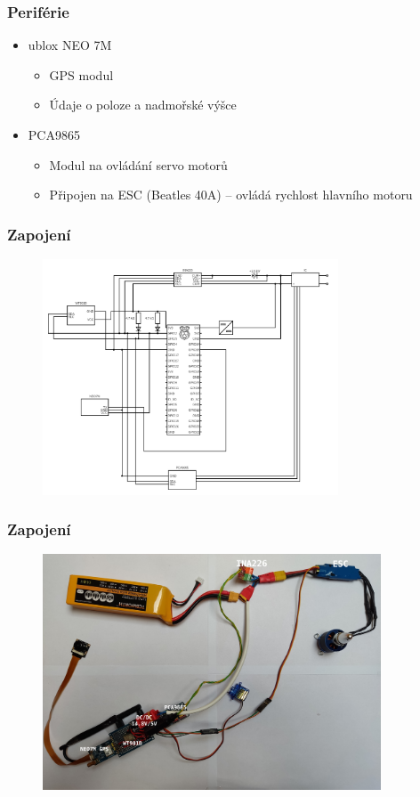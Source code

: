 \documentclass[aspectratio=43]{beamer}
\begin{document}
\begin{frame}[fragile]
	\frametitle{Periférie}
	\begin{itemize}
		\item ublox NEO 7M
			\begin{itemize}
				\item GPS modul
				\item Údaje o poloze a nadmořské výšce
			\end{itemize}
		\item PCA9865
			\begin{itemize}
				\item Modul na ovládání servo motorů
				\item Připojen na ESC (Beatles 40A) -- ovládá rychlost hlavního motoru
			\end{itemize}
	\end{itemize}
\end{frame}

\begin{frame}[fragile]
	\frametitle{Zapojení}
	\begin{figure}[h]
		\centering
		\includegraphics[height=7cm]{./../img/schema.png}
	\end{figure}
\end{frame}

\begin{frame}[fragile]
	\frametitle{Zapojení}
	\begin{figure}[h]
		\centering
		\includegraphics[height=7cm]{./../img/circuit.jpg}
	\end{figure}
\end{frame}
\end{document}
